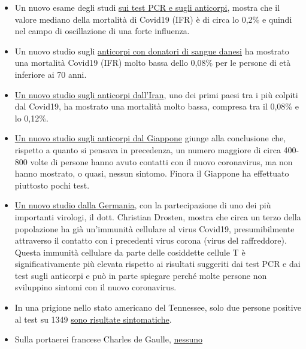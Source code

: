 \begin{itemize}
\tightlist
\item
  Un nuovo esame degli studi
  \href{https://swprs.org/studies-on-covid-19-lethality/}{sui test PCR e
  sugli anticorpi}, mostra che il valore mediano della mortalità di
  Covid19 (IFR) è di circa lo 0,2\% e quindi nel campo di oscillazione
  di una forte influenza.
\item
  Un nuovo studio sugli
  \href{https://www.medrxiv.org/content/10.1101/2020.04.24.20075291v1}{anticorpi
  con donatori di sangue danesi} ha mostrato una mortalità Covid19 (IFR)
  molto bassa dello 0,08\% per le persone di età inferiore ai 70 anni.
\item
  \href{https://www.medrxiv.org/content/10.1101/2020.04.26.20079244v1}{Un
  nuovo studio sugli anticorpi dall'Iran}, uno dei primi paesi tra i più
  colpiti dal Covid19, ha mostrato una mortalità molto bassa, compresa
  tra il 0,08\% e lo 0,12\%.
\item
  \href{https://www.medrxiv.org/content/10.1101/2020.04.26.20079822v1}{Un
  nuovo studio sugli anticorpi dal Giappone} giunge alla conclusione
  che, rispetto a quanto si pensava in precedenza, un numero maggiore di
  circa 400-800 volte di persone hanno avuto contatti con il nuovo
  coronavirus, ma non hanno mostrato, o quasi, nessun sintomo. Finora il
  Giappone ha effettuato piuttosto pochi test.
\item
  \href{https://www.medrxiv.org/content/10.1101/2020.04.17.20061440v1}{Un
  nuovo studio dalla Germania}, con la partecipazione di uno dei più
  importanti virologi, il dott. Christian Drosten, mostra che circa un
  terzo della popolazione ha già un'immunità cellulare al virus Covid19,
  presumibilmente attraverso il contatto con i precedenti virus corona
  (virus del raffreddore). Questa immunità cellulare da parte delle
  cosiddette cellule T è significativamente più elevata rispetto ai
  risultati suggeriti dai test PCR e dai test sugli anticorpi e può in
  parte spiegare perché molte persone non sviluppino sintomi con il
  nuovo coronavirus.
\item
  In una prigione nello stato americano del Tennessee, solo due persone
  positive al test su 1349
  \href{https://www.tennessean.com/story/news/politics/2020/05/01/tennessee-testing-all-inmates-prison-staff-after-multiple-outbreaks/3067388001/}{sono
  risultate sintomatiche}.
\item
  Sulla portaerei francese Charles de Gaulle,
  \href{https://en.wikipedia.org/wiki/COVID-19_pandemic_on_Charles_de_Gaulle}{nessuno}

\end{itemize}
